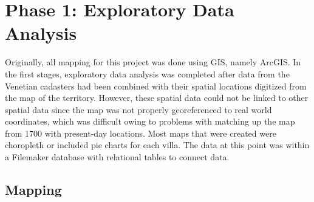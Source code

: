 \documentclass[english,]{book}
\begin{document}
\hypertarget{phase-1-exploratory-data-analysis}{%
\section{Phase 1: Exploratory Data Analysis}\label{phase-1-exploratory-data-analysis}}

Originally, all mapping for this project was done using GIS, namely ArcGIS. In the first stages, exploratory data analysis was completed after data from the Venetian cadasters had been combined with their spatial locations digitized from the map of the territory. However, these spatial data could not be linked to other spatial data since the map was not properly georeferenced to real world coordinates, which was difficult owing to problems with matching up the map from 1700 with present-day locations. Most maps that were created were choropleth or included pie charts for each villa. The data at this point was within a Filemaker database with relational tables to connect data.

\hypertarget{mapping-1}{%
\subsection{Mapping}\label{mapping-1}}
\end{document}
